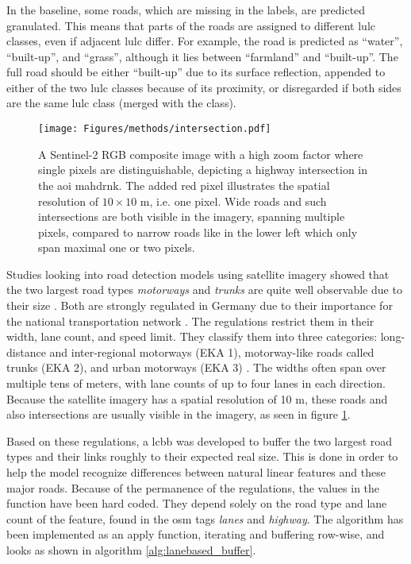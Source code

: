\subsubsection*{}

In the baseline, some roads, which are missing in the labels, are predicted granulated. This means that parts of the roads are assigned to different \gls{lulc} classes, even if adjacent \gls{lulc} differ. For example, the road is predicted as \enquote{water}, \enquote{built-up}, and \enquote{grass}, although it lies between \enquote{farmland} and \enquote{built-up}. The full road should be either \enquote{built-up} due to its surface reflection, appended to either of the two \gls{lulc} classes because of its proximity, or disregarded if both sides are the same \gls{lulc} class (merged with the class).

\begin{figure}[htb]
    \centering
    \texttt{[image: Figures/methods/intersection.pdf]}
    \caption[Pixel-Scale Sentinel-2 RGB Composite]{A Sentinel-2 RGB composite image with a high zoom factor where single pixels are distinguishable, depicting a highway intersection in the \gls{aoi} \gls{mahdrnk}. The added red pixel illustrates the spatial resolution of \( 10 \times 10 \) m, i.e. one pixel. Wide roads and such intersections are both visible in the imagery, spanning multiple pixels, compared to narrow roads like in the lower left which only span maximal one or two pixels.}
    \label{fig:lcbb}
\end{figure}

Studies looking into road detection models using satellite imagery showed that the two largest road types \emph{motorways} and \emph{trunks} are quite well observable due to their size \autocite{Atwal.Anderson.ea2022}. Both are strongly regulated in Germany due to their importance for the national transportation network \autocite{FGSV.2011}. The regulations restrict them in their width, lane count, and speed limit. They classify them into three categories: long-distance and inter-regional motorways (EKA 1), motorway-like roads called trunks (EKA 2), and urban motorways (EKA 3) \autocite{FGSV.2011}. The widths often span over multiple tens of meters, with lane counts of up to four lanes in each direction. Because the satellite imagery has a spatial resolution of 10 m, these roads and also intersections are usually visible in the imagery, as seen in figure \ref{fig:lcbb}.

Based on these regulations, a \gls{lcbb} was developed to buffer the two largest road types and their links roughly to their expected real size. This is done in order to help the model recognize differences between natural linear features and these major roads. Because of the permanence of the regulations, the values in the function have been hard coded. They depend solely on the road type and lane count of the feature, found in the \gls{osm} tags \emph{lanes} and \emph{highway}. The algorithm has been implemented as an apply function, iterating and buffering row-wise, and looks as shown in algorithm \ref{alg:lanebased_buffer}.

